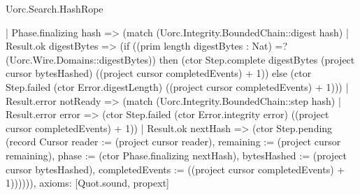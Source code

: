 \begin{lexlean}{Uorc.Search.HashRope}
\begin{semanticmodule}
{    | Phase.finalizing hash => (match (Uorc.Integrity.BoundedChain::digest hash)
      | Result.ok digestBytes => (if ((prim length digestBytes : Nat) =? (Uorc.Wire.Domains::digestBytes)) then (ctor Step.complete digestBytes (project cursor bytesHashed) ((project cursor completedEvents) + 1)) else (ctor Step.failed (ctor Error.digestLength) ((project cursor completedEvents) + 1)))
      | Result.error notReady => (match (Uorc.Integrity.BoundedChain::step hash)
        | Result.error error => (ctor Step.failed (ctor Error.integrity error) ((project cursor completedEvents) + 1))
        | Result.ok nextHash => (ctor Step.pending (record Cursor {reader := (project cursor reader), remaining := (project cursor remaining), phase := (ctor Phase.finalizing nextHash), bytesHashed := (project cursor bytesHashed), completedEvents := ((project cursor completedEvents) + 1)}))))),
  axioms: [Quot.sound, propext]
}
\end{semanticmodule}
\end{lexlean}
